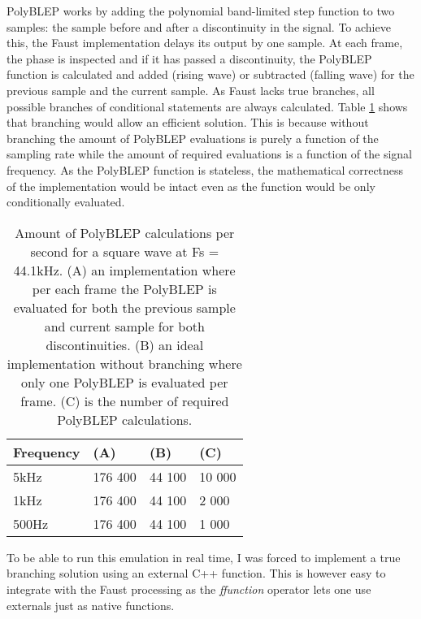 \documentclass[11pt,a4paper]{article}
\begin{document}
PolyBLEP works by adding the polynomial band-limited step function to two samples: the sample before and after a discontinuity in the signal. To achieve this, the Faust implementation delays its output by one sample. At each frame, the phase is inspected and if it has passed a discontinuity, the PolyBLEP function is calculated and added (rising wave) or subtracted (falling wave) for the previous sample and the current sample. As Faust lacks true branches, all possible branches of conditional statements are always calculated. Table \ref{table:polyblep-amount} shows that branching would allow an efficient solution. This is because without branching the amount of PolyBLEP evaluations is purely a function of the sampling rate while the amount of required evaluations is a function of the signal frequency. As the PolyBLEP function is stateless, the mathematical correctness of the implementation would be intact even as the function would be only conditionally evaluated.

\begin{table}[h]
 \begin{center}
\begin{tabular}{|l|l|l|l|}

      \hline
      Frequency & (A)        &  (B)         & (C) \\
      \hline\hline
      5kHz     & 176 400     & 44 100       & 10 000\\
      1kHz     & 176 400     & 44 100       &  2 000\\
      500Hz    & 176 400     & 44 100       &  1 000\\
      \hline

\end{tabular}
\caption{Amount of PolyBLEP calculations per second for a square wave at Fs = 44.1kHz. 
(A) an implementation where per each frame the PolyBLEP is evaluated for both the previous sample and current sample for both discontinuities.
(B) an ideal implementation without branching where only one PolyBLEP is evaluated per frame.
(C) is the number of required PolyBLEP calculations.  }\label{table:polyblep-amount}
 \end{center}
\end{table}

To be able to run this emulation in real time, I was forced to implement a true branching solution using an external C++ function. This is however easy to integrate with the Faust processing as the \emph{ffunction} operator lets one use externals just as native functions.
\end{document}
